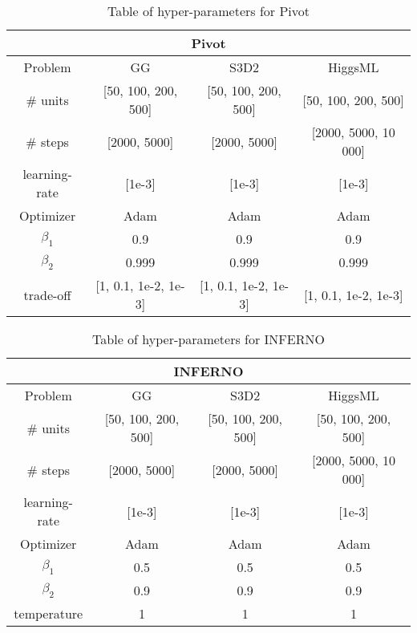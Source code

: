 \begin{table}[ht!]
\centering
\begin{tabular}{||c c c c||} 
 \hline
 \multicolumn{4}{|c|}{Pivot}\\
 \hline
 Problem & GG & S3D2 & HiggsML \\ [0.5ex] 
 \hline
 \# units & [50, 100, 200, 500] & [50, 100, 200, 500] & [50, 100, 200, 500] \\ 
 \# steps & [2000, 5000] & [2000, 5000] & [2000, 5000, 10 000] \\
 learning-rate & [1e-3] & [1e-3] & [1e-3] \\
 Optimizer & Adam & Adam & Adam \\
 $\beta_1$ & 0.9 & 0.9 & 0.9 \\
 $\beta_2$ & 0.999 & 0.999 & 0.999 \\
 trade-off & [1, 0.1, 1e-2, 1e-3] & [1, 0.1, 1e-2, 1e-3] & [1, 0.1, 1e-2, 1e-3] \\
 \hline
\end{tabular}
\caption{Table of hyper-parameters for Pivot}
\label{table:HP_PIVOT}
\end{table}


\begin{table}[ht!]
\centering
\begin{tabular}{||c c c c||} 
 \hline
 \multicolumn{4}{|c|}{INFERNO}\\
 \hline
 Problem & GG & S3D2 & HiggsML \\ [0.5ex] 
 \hline
 \# units & [50, 100, 200, 500] & [50, 100, 200, 500] & [50, 100, 200, 500] \\ 
 \# steps & [2000, 5000] & [2000, 5000] & [2000, 5000, 10 000] \\
 learning-rate & [1e-3] & [1e-3] & [1e-3] \\
 Optimizer & Adam & Adam & Adam \\
 $\beta_1$ & 0.5 & 0.5 & 0.5 \\
 $\beta_2$ & 0.9 & 0.9 & 0.9 \\
 temperature & 1 & 1 & 1 \\
 \hline
\end{tabular}
\caption{Table of hyper-parameters for INFERNO}
\label{table:HP_INF}
\end{table}




